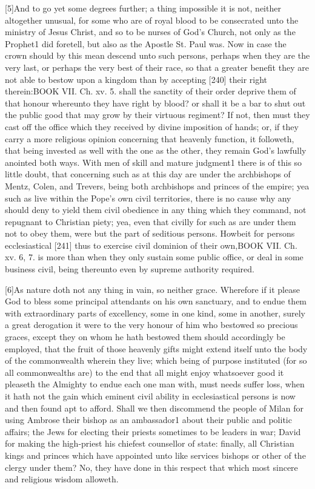 [5]And to go yet some degrees further; a thing impossible it is not, neither altogether unusual, for some who are of royal blood to be consecrated unto the ministry of Jesus Christ, and so to be nurses of God’s Church, not only as the Prophet1 did foretell, but also as the Apostle St. Paul was. Now in case the crown should by this mean descend unto such persons, perhaps when they are the very last, or perhaps the very best of their race, so that a greater benefit they are not able to bestow upon a kingdom than by accepting [240] their right therein:BOOK VII. Ch. xv. 5. shall the sanctity of their order deprive them of that honour whereunto they have right by blood? or shall it be a bar to shut out the public good that may grow by their virtuous regiment? If not, then must they cast off the office which they received by divine imposition of hands; or, if they carry a more religious opinion concerning that heavenly function, it followeth, that being invested as well with the one as the other, they remain God’s lawfully anointed both ways. With men of skill and mature judgment1 there is of this so little doubt, that concerning such as at this day are under the archbishops of Mentz, Colen, and Trevers, being both archbishops and princes of the empire; yea such as live within the Pope’s own civil territories, there is no cause why any should deny to yield them civil obedience in any thing which they command, not repugnant to Christian piety; yea, even that civilly for such as are under them not to obey them, were but the part of seditious persons. Howbeit for persons ecclesiastical [241] thus to exercise civil dominion of their own,BOOK VII. Ch. xv. 6, 7. is more than when they only sustain some public office, or deal in some business civil, being thereunto even by supreme authority required.

[6]As nature doth not any thing in vain, so neither grace. Wherefore if it please God to bless some principal attendants on his own sanctuary, and to endue them with extraordinary parts of excellency, some in one kind, some in another, surely a great derogation it were to the very honour of him who bestowed so precious graces, except they on whom he hath bestowed them should accordingly be employed, that the fruit of those heavenly gifts might extend itself unto the body of the commonwealth wherein they live; which being of purpose instituted (for so all commonwealths are) to the end that all might enjoy whatsoever good it pleaseth the Almighty to endue each one man with, must needs suffer loss, when it hath not the gain which eminent civil ability in ecclesiastical persons is now and then found apt to afford. Shall we then discommend the people of Milan for using Ambrose their bishop as an ambassador1 about their public and politic affairs; the Jews for electing their priests sometimes to be leaders in war; David for making the high-priest his chiefest counsellor of state: finally, all Christian kings and princes which have appointed unto like services bishops or other of the clergy under them? No, they have done in this respect that which most sincere and religious wisdom alloweth.


